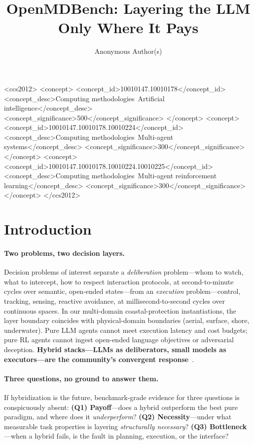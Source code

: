\documentclass[sigconf,anonymous]{aamas}
\title[OpenMDBench]{OpenMDBench: Layering the LLM Only Where It Pays}
\author{Anonymous Author(s)}
\affiliation{%
  \institution{Anonymous Institution}
  \city{}
  \country{}}
\begin{document}
\maketitle

\begin{CCSXML}
<ccs2012>
<concept>
<concept_id>10010147.10010178</concept_id>
<concept_desc>Computing methodologies~Artificial intelligence</concept_desc>
<concept_significance>500</concept_significance>
</concept>
<concept>
<concept_id>10010147.10010178.10010224</concept_id>
<concept_desc>Computing methodologies~Multi-agent systems</concept_desc>
<concept_significance>300</concept_significance>
</concept>
<concept>
<concept_id>10010147.10010178.10010224.10010225</concept_id>
<concept_desc>Computing methodologies~Multi-agent reinforcement learning</concept_desc>
<concept_significance>300</concept_significance>
</concept>
</ccs2012>
\end{CCSXML}

\section{Introduction}\label{sec:intro}

\paragraph{Two problems, two decision layers.}
Decision problems of interest separate a \emph{deliberation} problem---whom to watch, what to intercept, how to respect interaction protocols, at second-to-minute cycles over semantic, open-ended states---from an \emph{execution} problem---control, tracking, sensing, reactive avoidance, at millisecond-to-second cycles over continuous spaces. In our multi-domain coastal-protection instantiations, the layer boundary coincides with physical-domain boundaries (aerial, surface, shore, underwater). Pure LLM agents cannot meet execution latency and cost budgets; pure RL agents cannot ingest open-ended language objectives or adversarial deception. \textbf{Hybrid stacks---LLMs as deliberators, small models as executors---are the community's convergent response}~\cite{lamarl,lgcmarl,l2m2,reflectivellm}.

\paragraph{Three questions, no ground to answer them.}
If hybridization is the future, benchmark-grade evidence for three questions is conspicuously absent: \textbf{(Q1) Payoff}---does a hybrid outperform the best pure paradigm, and where does it \emph{underperform}? \textbf{(Q2) Necessity}---under what measurable task properties is layering \emph{structurally necessary}? \textbf{(Q3) Bottleneck}---when a hybrid fails, is the fault in planning, execution, or the interface?
\end{document}
